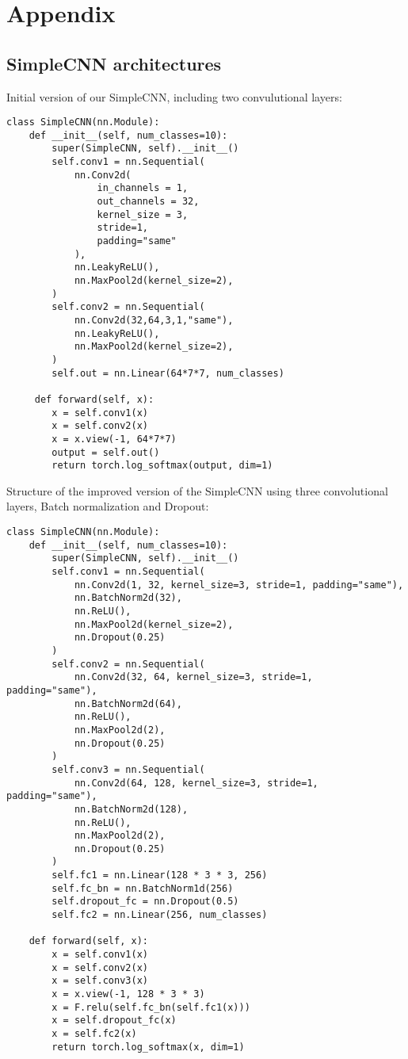 \section{Appendix}
\subsection{SimpleCNN architectures}\label{codeSnippets}
Initial version of our SimpleCNN, including two convulutional layers:\@

\begin{verbatim}
class SimpleCNN(nn.Module):
    def __init__(self, num_classes=10):
        super(SimpleCNN, self).__init__()
        self.conv1 = nn.Sequential(
            nn.Conv2d(
                in_channels = 1,
                out_channels = 32,
                kernel_size = 3,
                stride=1,
                padding="same"
            ),
            nn.LeakyReLU(),
            nn.MaxPool2d(kernel_size=2),
        )
        self.conv2 = nn.Sequential(
            nn.Conv2d(32,64,3,1,"same"),
            nn.LeakyReLU(),
            nn.MaxPool2d(kernel_size=2),
        )
        self.out = nn.Linear(64*7*7, num_classes)

     def forward(self, x):
        x = self.conv1(x)
        x = self.conv2(x)
        x = x.view(-1, 64*7*7)
        output = self.out()
        return torch.log_softmax(output, dim=1)
\end{verbatim}


Structure of the improved version of the SimpleCNN using three convolutional layers, Batch normalization and Dropout:\@

\begin{verbatim}
class SimpleCNN(nn.Module):
    def __init__(self, num_classes=10):
        super(SimpleCNN, self).__init__()
        self.conv1 = nn.Sequential(
            nn.Conv2d(1, 32, kernel_size=3, stride=1, padding="same"),
            nn.BatchNorm2d(32),
            nn.ReLU(),
            nn.MaxPool2d(kernel_size=2),
            nn.Dropout(0.25)
        )
        self.conv2 = nn.Sequential(
            nn.Conv2d(32, 64, kernel_size=3, stride=1, padding="same"),
            nn.BatchNorm2d(64),
            nn.ReLU(),
            nn.MaxPool2d(2),
            nn.Dropout(0.25)
        )
        self.conv3 = nn.Sequential(
            nn.Conv2d(64, 128, kernel_size=3, stride=1, padding="same"),
            nn.BatchNorm2d(128),
            nn.ReLU(),
            nn.MaxPool2d(2),
            nn.Dropout(0.25)
        )
        self.fc1 = nn.Linear(128 * 3 * 3, 256)
        self.fc_bn = nn.BatchNorm1d(256)
        self.dropout_fc = nn.Dropout(0.5)
        self.fc2 = nn.Linear(256, num_classes)

    def forward(self, x):
        x = self.conv1(x)
        x = self.conv2(x)
        x = self.conv3(x)
        x = x.view(-1, 128 * 3 * 3)
        x = F.relu(self.fc_bn(self.fc1(x)))
        x = self.dropout_fc(x)
        x = self.fc2(x)
        return torch.log_softmax(x, dim=1)
\end{verbatim}
    

